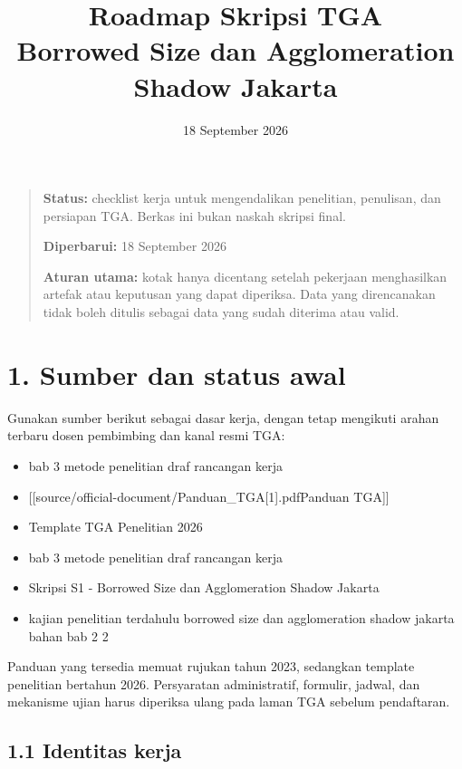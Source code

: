 \documentclass[
  indonesian,
  11pt,
]{article}
\title{Roadmap Skripsi TGA\\[0.35em]
  \large Borrowed Size dan Agglomeration Shadow Jakarta}
\author{}
\date{18 September 2026}
\providecommand{\tightlist}{%
  \setlength{\itemsep}{0pt}\setlength{\parskip}{0pt}}
\renewcommand{\tightlist}{%
  \setlength{\itemsep}{0.22em}%
  \setlength{\parskip}{0pt}%
}
\begin{document}
\maketitle
\renewcommand*\contentsname{Daftar Isi}
\setcounter{tocdepth}{2}
\tableofcontents\clearpage
\begin{quote}
\textbf{Status:} checklist kerja untuk mengendalikan penelitian,
penulisan, dan persiapan TGA. Berkas ini bukan naskah skripsi final.

\textbf{Diperbarui:} 18 September 2026

\textbf{Aturan utama:} kotak hanya dicentang setelah pekerjaan
menghasilkan artefak atau keputusan yang dapat diperiksa. Data yang
direncanakan tidak boleh ditulis sebagai data yang sudah diterima atau
valid.
\end{quote}

\section{1. Sumber dan status awal}\label{sumber-dan-status-awal}

Gunakan sumber berikut sebagai dasar kerja, dengan tetap mengikuti
arahan terbaru dosen pembimbing dan kanal resmi TGA:

\begin{itemize}
\tightlist
\item
  bab 3 metode penelitian draf rancangan kerja
\item
  {[}{[}source/official-document/Panduan\_TGA{[}1{]}.pdf\textbar Panduan
  TGA{]}{]}
\item
  Template TGA Penelitian 2026
\item
  bab 3 metode penelitian draf rancangan kerja
\item
  Skripsi S1 - Borrowed Size dan Agglomeration Shadow Jakarta
\item
  kajian penelitian terdahulu borrowed size dan agglomeration shadow
  jakarta bahan bab 2 2
\end{itemize}

Panduan yang tersedia memuat rujukan tahun 2023, sedangkan template
penelitian bertahun 2026. Persyaratan administratif, formulir, jadwal,
dan mekanisme ujian harus diperiksa ulang pada laman TGA sebelum
pendaftaran.

\subsection{1.1 Identitas kerja}\label{identitas-kerja}
\end{document}
